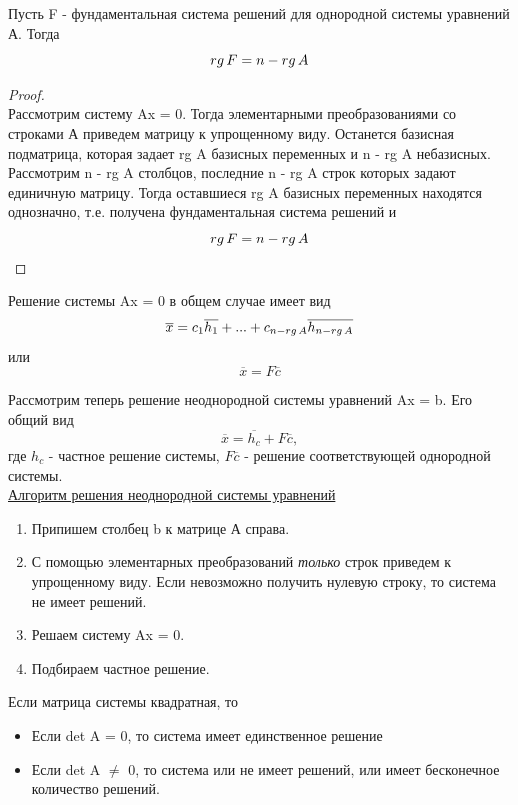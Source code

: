 \begin{theorem}
    Пусть F - фундаментальная система решений для однородной системы уравнений А. Тогда
    \[
    rg\thinspace F = n - rg\thinspace A
    \]
\end{theorem}
\begin{proof}
    \tab\\

    Рассмотрим систему Ax = 0. Тогда элементарными преобразованиями со строками А приведем матрицу к упрощенному виду. Останется базисная подматрица, которая задает rg A базисных переменных и n - rg A небазисных. \\

    Рассмотрим n - rg A столбцов, последние n - rg A строк которых задают единичную матрицу. Тогда оставшиеся rg A базисных переменных находятся однозначно, т.е. получена фундаментальная система решений и 
    \[
    rg\thinspace F = n - rg\thinspace A
    \]
\end{proof}

Решение системы Ax = 0 в общем случае имеет вид
\[
\overline{x} = c_1\overline{h_1} + ... + c_{n - rg\thinspace A}\overline{h_{n - rg\thinspace A}}
\]
или
\[
\overline{x} = F\overline{c}
\]

Рассмотрим теперь решение неоднородной системы уравнений Ax = b. Его общий вид
\[
\overline{x} = \overline{h_c} + F\overline{c},
\]
где $h_c$ - частное решение системы, $F\overline{c}$ - решение соответствующей однородной системы.\\

\underline{Алгоритм решения неоднородной системы уравнений}
\begin{enumerate}
    \item Припишем столбец b к матрице А справа.
    \item  С помощью элементарных преобразований \textit{только} строк приведем к упрощенному виду. Если невозможно получить нулевую строку, то система не имеет решений.
    \item Решаем систему Ax = 0.
    \item Подбираем частное решение.
\end{enumerate}

Если матрица системы квадратная, то 
\begin{itemize}
    \item Если det A = 0, то система имеет единственное решение
    \item Если det A $\neq$ 0, то система или не имеет решений, или имеет бесконечное количество решений.
\end{itemize}


